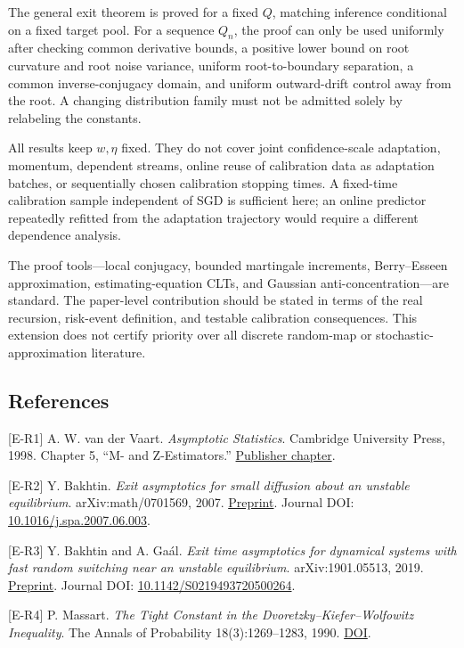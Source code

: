 The general exit theorem is proved for a fixed \(Q\), matching inference
conditional on a fixed target pool. For a sequence \(Q_n\), the proof
can only be used uniformly after checking common derivative bounds, a
positive lower bound on root curvature and root noise variance, uniform
root-to-boundary separation, a common inverse-conjugacy domain, and
uniform outward-drift control away from the root. A changing
distribution family must not be admitted solely by relabeling the
constants.

All results keep \(w,\eta\) fixed. They do not cover joint
confidence-scale adaptation, momentum, dependent streams, online reuse
of calibration data as adaptation batches, or sequentially chosen
calibration stopping times. A fixed-time calibration sample independent
of SGD is sufficient here; an online predictor repeatedly refitted from
the adaptation trajectory would require a different dependence analysis.

The proof tools---local conjugacy, bounded martingale increments,
Berry--Esseen approximation, estimating-equation CLTs, and Gaussian
anti-concentration---are standard. The paper-level contribution should
be stated in terms of the real recursion, risk-event definition, and
testable calibration consequences. This extension does not certify
priority over all discrete random-map or stochastic-approximation
literature.

\subsection{References}\label{risk_boundaries-references}

{[}E-R1{]} A. W. van der Vaart. \emph{Asymptotic Statistics}. Cambridge
University Press, 1998. Chapter 5, ``M- and Z-Estimators.''
\href{https://doi.org/10.1017/CBO9780511802256.006}{Publisher chapter}.

{[}E-R2{]} Y. Bakhtin. \emph{Exit asymptotics for small diffusion about
an unstable equilibrium}. arXiv:math/0701569, 2007.
\href{https://arxiv.org/abs/math/0701569}{Preprint}. Journal DOI:
\href{https://doi.org/10.1016/j.spa.2007.06.003}{10.1016/j.spa.2007.06.003}.

{[}E-R3{]} Y. Bakhtin and A. Gaál. \emph{Exit time asymptotics for
dynamical systems with fast random switching near an unstable
equilibrium}. arXiv:1901.05513, 2019.
\href{https://arxiv.org/abs/1901.05513}{Preprint}. Journal DOI:
\href{https://doi.org/10.1142/S0219493720500264}{10.1142/S0219493720500264}.

{[}E-R4{]} P. Massart. \emph{The Tight Constant in the
Dvoretzky--Kiefer--Wolfowitz Inequality}. The Annals of Probability
18(3):1269--1283, 1990.
\href{https://doi.org/10.1214/aop/1176990746}{DOI}.

